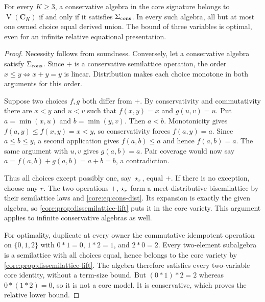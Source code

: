 \begin{theorem}
\label{core:thm:conservative-basis}
For every $K\geq3$, a conservative algebra in the core signature
belongs to $\operatorname V(\mathbf C_K)$ if and only if it satisfies
$\Sigma_{\rm cons}$. In every such algebra, all but at most one
owned choice equal derived union. The bound of three variables is
optimal, even for an infinite relative equational presentation.
\end{theorem}
\begin{proof}
Necessity follows from soundness. Conversely, let a conservative
algebra satisfy $\Sigma_{\rm cons}$. Since $+$ is a conservative
semilattice operation, the order $x\leq y\iff x+y=y$ is linear.
Distribution makes each choice monotone in both arguments for this
order.

Suppose two choices $f,g$ both differ from $+$. By conservativity
and commutativity there are $x<y$ and $u<v$ such that
$f(x,y)=x$ and $g(u,v)=u$. Put
$a=\min(x,u)$ and $b=\min(y,v)$. Then $a<b$.
Monotonicity gives $f(a,y)\leq f(x,y)=x<y$, so conservativity
forces $f(a,y)=a$. Since $a\leq b\leq y$, a second application
gives $f(a,b)\leq a$ and hence $f(a,b)=a$. The same argument
with $u,v$ gives $g(a,b)=a$. Pair coverage would now say
$a=f(a,b)+g(a,b)=a+b=b$, a contradiction.

Thus all choices except possibly one, say $\star_r$, equal $+$.
If there is no exception, choose any $r$. The two operations
$+,\star_r$ form a meet-distributive bisemilattice by their
semilattice laws and \eqref{core:eq:cons-dist}. Its expansion is
exactly the given algebra, so
\cref{core:prop:dissemilattice-lift} puts it in the core variety.
This argument applies to infinite conservative algebras as well.

For optimality, duplicate at every owner the commutative idempotent
operation on $\{0,1,2\}$ with
$0*1=0$, $1*2=1$, and $2*0=2$. Every two-element subalgebra is a
semilattice with all choices equal, hence belongs to the core
variety by \cref{core:prop:dissemilattice-lift}. The algebra therefore
satisfies every two-variable core identity, without a term-size
bound. But $(0*1)*2=2$ whereas $0*(1*2)=0$, so it is not a core
model. It is conservative, which proves the relative lower bound.
\end{proof}

